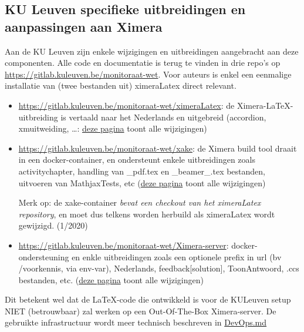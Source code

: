 \documentclass{ximera}
\begin{document}
\subsection{KU Leuven specifieke uitbreidingen en aanpassingen aan Ximera}

Aan de KU Leuven zijn enkele wijzigingen en uitbreidingen aangebracht aan deze componenten.
Alle code en documentatie is terug te vinden in drie repo's op 
\url{https://gitlab.kuleuven.be/monitoraat-wet}. Voor auteurs is enkel een eenmalige installatie van (twee bestanden uit) ximeraLatex direct relevant.

\begin{itemize}
	\item \url{https://gitlab.kuleuven.be/monitoraat-wet/ximeraLatex}: de Ximera-\LaTeX-uitbreiding is vertaald naar het Nederlands en uitgebreid (accordion, xmuitweiding, \ldots:  \href{https://gitlab.kuleuven.be/monitoraat-wet/ximeraLatex/compare/f47d71eb646d92e7e8c7953c5cc96ef18b4c740d...master}{deze pagina} toont alle wijzigingen)
	\item \url{https://gitlab.kuleuven.be/monitoraat-wet/xake}: de Ximera build tool draait in een docker-container, en ondersteunt enkele uitbreidingen zoals activitychapter, handling van \_pdf.tex en \_beamer\_\*.tex bestanden, uitvoeren van MathjaxTests, etc (\href{https://gitlab.kuleuven.be/monitoraat-wet/xake/compare/d298e4b3f3ba630fece197b66c1512ba1b2b8c81...master}{deze pagina} toont alle wijzigingen)
    
    Merk op: de xake-container \textit{bevat een checkout van het ximeraLatex repository}, en moet dus telkens worden herbuild als ximeraLatex wordt gewijzigd. (1/2020)
    
    
	\item \url{https://gitlab.kuleuven.be/monitoraat-wet/Ximera-server}: docker-ondersteuning en enkle uitbreidingen zoals een optionele prefix in url (bv /voorkennis, via env-var), Nederlands, feedback[solution], ToonAntwoord, .ccs bestanden, etc. (\textunderscore\href{https://gitlab.kuleuven.be/monitoraat-wet/Ximera-server/compare/0f0d1f53d96c5a6ca44a38653dc3f266ee69c08f...master}{deze pagina} toont alle wijzigingen)
\end{itemize}

Dit betekent wel dat de LaTeX-code die ontwikkeld is voor de KULeuven setup NIET (betrouwbaar) zal werken op een Out-Of-The-Box Ximera-server.
De gebruikte infrastructuur wordt meer technisch beschreven in \href{https://gitlab.kuleuven.be/monitoraat-wet/zomercursus-wiskunde/blob/master/DevOps.md}{DevOps.md}
\end{document}
